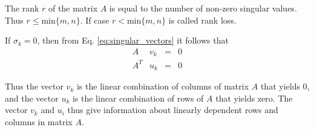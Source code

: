 \documentclass [english,memo]{xarticle}
\begin{document}
The rank $r$ of the matrix $A$ is equal to the number of non-zero singular values.
Thus $r \leq \text{min}\{m, n\}$.
If case $r < \text{min}\{m, n\}$ is called rank loss.

If $\sigma_k = 0$, then from Eq. \ref{eq:singular_vectors} it follows that
\begin{equation}\label{eq:null_vectors}
\begin{array}{llcl}
A   &v_k & = & 0 \\
A^T & u_k & = & 0
\end{array}
\end{equation}

Thus the vector $v_k$ is the linear combination of columns of
matrix $A$ that yields 0, and the vector $u_k$ is the linear combination
of rows of $A$ that yields zero. The vector $v_k$ and $u_i$ thus
give information about linearly dependent rows and columns in matrix $A$.



\end{document}
